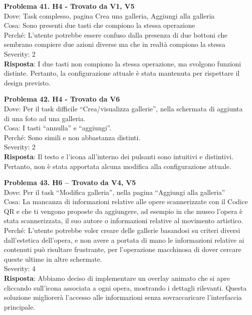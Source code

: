 \documentclass{article}
\begin{document}
\noindent \textbf{Problema 41. H4 - Trovato da V1, V5} \\
Dove: Task complesso, pagina Crea una galleria, Aggiungi alla galleria \\
Cosa: Sono presenti due tasti che compiono la stessa operazione \\
Perché: L’utente potrebbe essere confuso dalla presenza di due bottoni che sembrano compiere due azioni diverse ma che in realtà compiono la stessa \\
Severity: 2 \\
\textbf{Risposta}: I due tasti non compiono la stessa operazione, ma svolgono funzioni distinte. Pertanto, la configurazione attuale è stata mantenuta per rispettare il design previsto.

\noindent \textbf{Problema 42. H4 - Trovato da V6} \\
Dove: Per il task difficile “Crea/visualizza gallerie”, nella schermata di aggiunta di una foto ad una galleria. \\
Cosa: I tasti “annulla” e “aggiungi”. \\
Perché: Sono simili e non abbastanza distinti. \\
Severity: 2 \\
\textbf{Risposta}: Il testo e l’icona all’interno dei pulsanti sono intuitivi e distintivi. Pertanto, non è stata apportata alcuna modifica alla configurazione attuale.

\noindent \textbf{Problema 43. H6 – Trovato da V4, V5} \\
Dove: Per il task “Modifica galleria”, nella pagina “Aggiungi alla galleria” \\
Cosa: La mancanza di informazioni relative alle opere scannerizzate con il Codice QR e che ti vengono proposte da aggiungere, ad esempio in che museo l’opera è stata scannerizzata, il suo autore o informazioni relative al movimento artistico. \\
Perché: L’utente potrebbe voler creare delle gallerie basandosi su criteri diversi dall’estetica dell’opera, e non avere a portata di mano le informazioni relative ai contenuti può risultare frustrante, per l’operazione macchinosa di dover cercare queste ultime in altre schermate. \\
Severity: 4 \\
\textbf{Risposta}: Abbiamo deciso di implementare un overlay animato che si apre cliccando sull’icona associata a ogni opera, mostrando i dettagli rilevanti. Questa soluzione migliorerà l’accesso alle informazioni senza sovraccaricare l’interfaccia principale.
\end{document}
